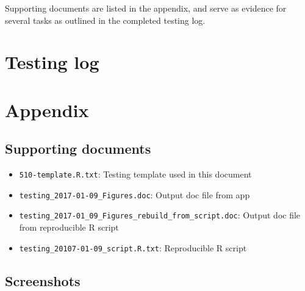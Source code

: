 \documentclass{article}
\newcommand{\testinglog}{testing-log-complete.pdf}
\begin{document}
Supporting documents are listed in the appendix, and serve as evidence for several 
tasks as outlined in the completed testing log.

\newpage
\section*{Testing log}



\newpage


\section*{Appendix}

\subsection*{Supporting documents}
\begin{itemize}
  \item \verb|510-template.R.txt|: Testing template used in this document
  \item \verb|testing_2017-01-09_Figures.doc|: Output doc file from app
  \item \verb|testing_2017-01_09_Figures_rebuild_from_script.doc|: Output doc file
  from reproducible R script
  \item \verb|testing_20107-01-09_script.R.txt|: Reproducible R script
\end{itemize}

\newpage

\subsection*{Screenshots}




\end{document}
